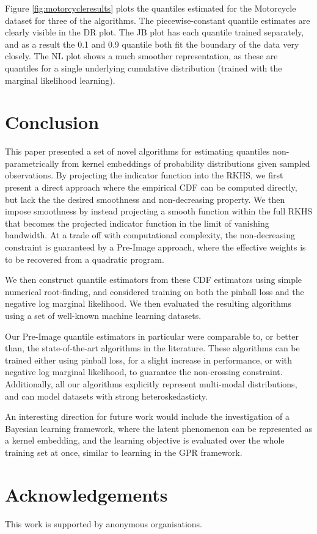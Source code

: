 \documentclass[twoside]{article} \usepackage{aistats2017}
\theoremstyle{definition}
\theoremstyle{theorem}
\begin{document}
		Figure \ref{fig:motorcycleresults} plots the quantiles estimated for the Motorcycle dataset for three of the algorithms. The piecewise-constant quantile estimates are clearly visible in the DR plot. The JB plot has each quantile trained separately, and as a result the 0.1 and 0.9 quantile both fit the boundary of the data very closely. The NL plot shows a much smoother representation, as these are quantiles for a single underlying cumulative distribution (trained with the marginal likelihood learning).

\section{Conclusion}
\label{sec:conclusion}
	
	This paper presented a set of novel algorithms for estimating quantiles non-parametrically from kernel embeddings of probability distributions given sampled observations. By projecting the indicator function into the RKHS, we first present a direct approach where the empirical CDF can be computed directly, but lack the the desired smoothness and non-decreasing property. We then impose smoothness by instead projecting a smooth function within the full RKHS that becomes the projected indicator function in the limit of vanishing bandwidth. At a trade off with computational complexity, the non-decreasing constraint is guaranteed by a Pre-Image approach, where the effective weights is to be recovered from a quadratic program.
	
	We then construct quantile estimators from these CDF estimators using simple numerical root-finding, and considered training on both the pinball loss and the negative log marginal likelihood. We then evaluated the resulting algorithms using a set of well-known machine learning datasets.
	
	Our Pre-Image quantile estimators in particular were comparable to, or better than, the state-of-the-art algorithms in the literature. These algorithms can be trained either using pinball loss, for a slight increase in performance, or with negative log marginal likelihood, to guarantee the non-crossing constraint. Additionally, all our algorithms explicitly represent multi-modal distributions, and can model datasets with strong heteroskedasticty.
	
	An interesting direction for future work would include the investigation of a Bayesian learning framework, where the latent phenomenon can be represented as a kernel embedding, and the learning objective is evaluated over the whole training set at once, similar to learning in the GPR framework.

\section*{Acknowledgements}

	This work is supported by anonymous organisations.


\end{document}
